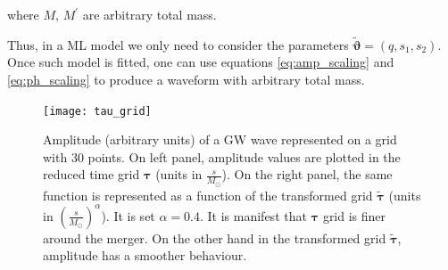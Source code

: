 where $M$, $M^\prime$ are arbitrary total mass.
\par
Thus, in a ML model we only need to consider the parameters ${\tilde{\boldsymbol{\vartheta}} = (q, s_1, s_2)}$.
Once such model is fitted, one can use equations \eqref{eq:amp_scaling} and \eqref{eq:ph_scaling} to produce a waveform with arbitrary total mass.
%
\begin{figure}[!t]
	\centering
	\texttt{[image: tau\_grid]}
	\caption{Amplitude (arbitrary units) of a GW wave represented on a grid with 30 points. On left panel, amplitude values are plotted in the reduced time grid $\boldsymbol{\tau}$ (units in $\frac{s}{M_\odot}$). On the right panel, the same function is represented as a function of the transformed grid $\boldsymbol{\tilde{\tau}}$ (units in $\left(\frac{s}{M_\odot}\right)^\alpha$).
It is set $\alpha = 0.4$.
It is manifest that $\boldsymbol{\tau}$ grid is finer around the merger. On the other hand in the transformed grid $\boldsymbol{\tilde{\tau}}$, amplitude has a smoother behaviour. 
}
	\label{fig:tau_grid}
\end{figure}
%
